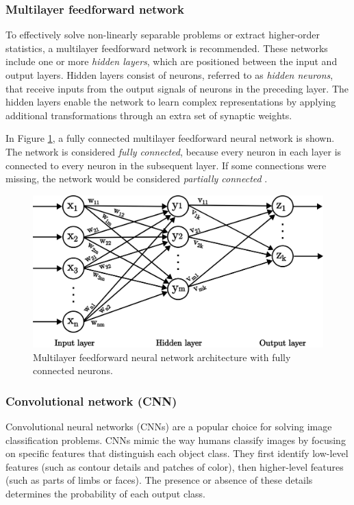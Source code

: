 \documentclass[a4paper,oneside,onecolumn,12pt]{book}
\begin{document}
		\subsubsection{Multilayer feedforward network}
		To effectively solve non-linearly separable problems or extract higher-order statistics, a multilayer feedforward network is recommended. These networks include one or more \textit{hidden layers}, which are positioned between the input and output layers. Hidden layers consist of neurons, referred to as \textit{hidden neurons}, that receive inputs from the output signals of neurons in the preceding layer. The hidden layers enable the network to learn complex representations by applying additional transformations through an extra set of synaptic weights. 

		In Figure \ref{fig:smultilayer feedforward nn}, a fully connected multilayer feedforward neural network is shown. The network is considered \textit{fully connected}, because every neuron in each layer is connected to every neuron in the subsequent layer. If some connections were missing, the network would be considered \textit{partially connected} \cite{NNACF}.
		\begin{figure}[H]
		\begin{center}
			\includegraphics[keepaspectratio,width=14cm]{kep/multi_layer_feedforward_nn.png}
			\caption{Multilayer feedforward neural network architecture with fully connected neurons.}
			\label{fig:smultilayer feedforward nn}
		\end{center}
		\end{figure}
		
		\subsubsection{Convolutional network (CNN)}
		Convolutional neural networks (CNNs) are a popular choice for solving image classification problems. CNNs mimic the way humans classify images by focusing on specific features that distinguish each object class. They first identify low-level features (such as contour details and patches of color), then higher-level features (such as parts of limbs or faces). The presence or absence of these details determines the probability of each output class.
\end{document}
